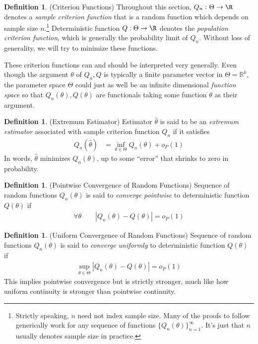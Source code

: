 \documentclass[12pt]{article}
\theoremstyle{plain}
\theoremstyle{definition}
\newtheorem{defn}[thm]{Definition}
\theoremstyle{remark}
\newcommand{\ra}{\rightarrow}
\newcommand{\Rk}{\mathbb{R}^k}
\newcommand{\ninf}{_{n=1}^\infty}
\begin{document}
\begin{defn}(Criterion Functions)
Throughout this section, $Q_n:\Theta\ra\R$ denotes a
\emph{sample criterion function} that is a random function
which depends on sample size $n$.\footnote{%
  Strictly speaking, $n$ need not index sample size. Many of the proofs
  to follow generically work for any sequence of functions
  $\{Q_n(\theta)\}\ninf$. It's just that $n$ usually denotes sample size
  in practice.
}
Deterministic function $Q:\Theta\ra\R$ denotes the
\emph{population criterion function}, which is generally the probability
limit of $Q_n$.
Without loss of generality, we will try to minimize these functions.

These criterion functions can and should be interpreted very generally.
Even though the argument $\theta$ of $Q_n,Q$ is typically a finite
parameter vector in $\Theta=\Rk$, the parameter space $\Theta$ could
just as well be an infinite dimensional \emph{function space} so that
$Q_n(\theta),Q(\theta)$ are functionals taking some function $\theta$ as
their argument.
\end{defn}

\begin{defn}(Extremum Estimator)
Estimator $\hat{\theta}$ is said to be an \emph{extremum estimator}
associated with sample criterion function $Q_n$ if it satisfies
\begin{align*}
  Q_n(\hat{\theta})
  &=
  \inf_{\theta\in \Theta}
  Q_n(\theta)
  +
  o_P(1)
\end{align*}
In words, $\hat{\theta}$ minimizes $Q_n(\theta)$, up to some ``error''
that shrinks to zero in probability.
\end{defn}

\begin{defn}(Pointwise Convergence of Random Functions)
Sequence of random functions $Q_n(\theta)$ is said to
\emph{converge pointwise} to deterministic function $Q(\theta)$
if
\begin{align*}
  \forall \theta
  \qquad
  |Q_n(\theta)-Q(\theta)|
  =
  o_P(1)
\end{align*}
\end{defn}

\begin{defn}(Uniform Convergence of Random Functions)
Sequence of random functions $Q_n(\theta)$ is said to
\emph{converge uniformly} to deterministic function $Q(\theta)$
if
\begin{align*}
  \sup_{\theta\in\Theta}
  |Q_n(\theta)-Q(\theta)|
  =
  o_P(1)
\end{align*}
This implies pointwise convergence but is strictly stronger, much like
how uniform continuity is stronger than pointwise continuity.
\end{defn}
\end{document}
